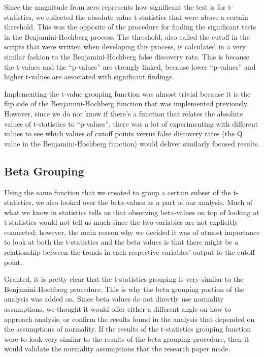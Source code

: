 \par Since the magnitude from zero represents how significant the test is for
t-statistics, we collected the absolute value t-statistics that were above a 
certain threshold. This was the opposite of the procedure for finding the 
significant tests in the Benjamini-Hochberg process. The threshold, also called
the cutoff in the scripts that were written when developing this process, is 
calculated in a very similar fashion to the Benjamini-Hochberg false discovery 
rate. This is because the t-values and the ``p-values'' are strongly linked,
because lower ``p-values'' and higher t-values are associated with significant 
findings. 

\par Implementing the t-value grouping function was almost trivial because it 
is the flip side of the Benjamini-Hochberg function that was implemented 
previously. However, since we do not know if there's a function that relates 
the absolute values of t-statistics to ``p-values'', there was a lot of 
experimenting with different values to see which values of cutoff points versus
false discovery rates (the Q value in the Benjamini-Hochberg function) would 
deliver similarly focused results.

\subsection{Beta Grouping}

\par Using the same function that we created to group a certain subset of the 
t-statistics, we also looked over the beta-values as a part of our analysis. 
Much of what we know in statistics tells us that observing beta-values on top 
of looking at t-statistics would not tell us much since the two variables are 
not explicitly connected; however, the main reason why we decided it was of 
utmost importance to look at both the t-statistics and the beta values is that 
there might be a relationship between the trends in each respective variables'
output to the cutoff point. 

\par Granted, it is pretty clear that the t-statistics grouping is very similar
to the Benjamini-Hochberg procedure. This is why the beta grouping portion of 
the analysis was added on. Since beta values do not directly use normality 
assumptions, we thought it would offer either a different angle on how to 
approach analysis, or confirm the results found in the analysis that depended 
on the assumptions of normality. If the results of the t-statistics grouping 
function were to look very similar to the results of the beta grouping 
procedure, then it would validate the normality assumptions that the research 
paper made. 